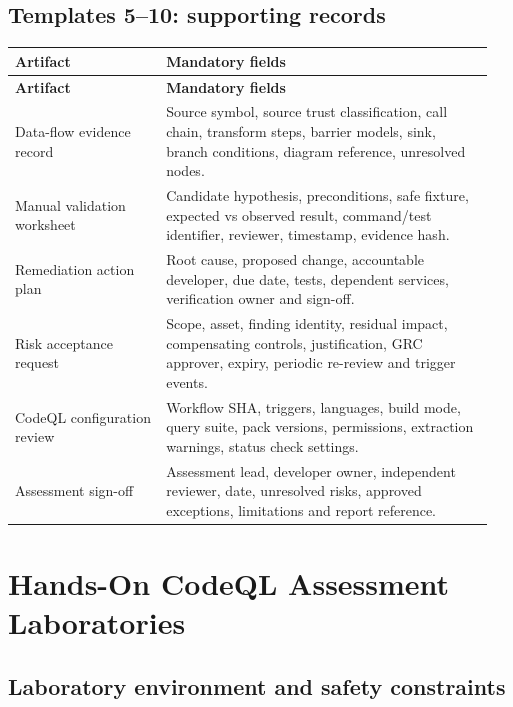 \documentclass[11pt,letterpaper,oneside]{book}
\begin{document}
\normalsize

\section{Templates 5--10: supporting records}

\small
\setlength{\tabcolsep}{2pt}
\renewcommand{\arraystretch}{1.18}
\begin{longtable}{>{\raggedright\arraybackslash}p{0.3\linewidth}>{\raggedright\arraybackslash}p{0.65\linewidth}}
\toprule
\textbf{Artifact} & \textbf{Mandatory fields}\\
\midrule
\endfirsthead
\toprule
\textbf{Artifact} & \textbf{Mandatory fields}\\
\midrule
\endhead
Data-flow evidence record & Source symbol, source trust classification, call chain, transform steps, barrier models, sink, branch conditions, diagram reference, unresolved nodes.\\
Manual validation worksheet & Candidate hypothesis, preconditions, safe fixture, expected vs observed result, command/test identifier, reviewer, timestamp, evidence hash.\\
Remediation action plan & Root cause, proposed change, accountable developer, due date, tests, dependent services, verification owner and sign-off.\\
Risk acceptance request & Scope, asset, finding identity, residual impact, compensating controls, justification, GRC approver, expiry, periodic re-review and trigger events.\\
CodeQL configuration review & Workflow SHA, triggers, languages, build mode, query suite, pack versions, permissions, extraction warnings, status check settings.\\
Assessment sign-off & Assessment lead, developer owner, independent reviewer, date, unresolved risks, approved exceptions, limitations and report reference.\\
\bottomrule
\end{longtable}
\normalsize

\chapter{Hands-On CodeQL Assessment Laboratories}

\section{Laboratory environment and safety constraints}
\end{document}
